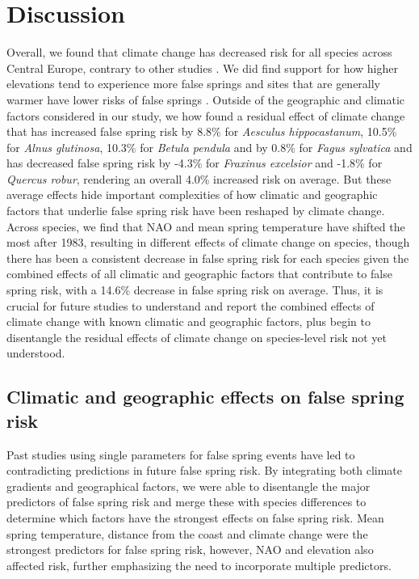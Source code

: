 \documentclass{article}\usepackage[]{graphicx}\usepackage[]{color}
\begin{document}
\renewcommand{\thetable}{\arabic{table}}
\renewcommand{\thefigure}{\arabic{figure}}
\renewcommand{\labelitemi}{$-$}

\section*{Discussion}
Overall, we found that climate change has decreased risk for all species across Central Europe, contrary to other studies \citep{Liu2018}. We did find support for how higher elevations tend to experience more false springs \citep{Vitasse2018, Vitra2017} and sites that are generally warmer have lower risks of false springs \citep{Wypych2016}. Outside of the geographic and climatic factors considered in our study, we how found a residual effect of climate change that has increased false spring risk by 8.8\% for \textit{Aesculus hippocastanum}, 10.5\% for \textit{Alnus glutinosa}, 10.3\% for \textit{Betula pendula} and by 0.8\% for \textit{Fagus sylvatica} and has decreased false spring risk by -4.3\% for \textit{Fraxinus excelsior} and -1.8\% for \textit{Quercus robur}, rendering an overall 4.0\% increased risk on average. But these average effects hide important complexities of how climatic and geographic factors that underlie false spring risk have been reshaped by climate change. Across species, we find that NAO and mean spring temperature have shifted the most after 1983, resulting in different effects of climate change on species, though there has been a consistent decrease in false spring risk for each species given the combined effects of all climatic and geographic factors that contribute to false spring risk, with a 14.6\% decrease in false spring risk on average. Thus, it is crucial for future studies to understand and report the combined effects of climate change with known climatic and geographic factors, plus begin to disentangle the residual effects of climate change on species-level risk not yet understood. %

\subsection*{Climatic and geographic effects on false spring risk}
Past studies using single parameters for false spring events \citep{Liu2018, Ma2018, Vitasse2018, Vitra2017, Wypych2016a} have led to contradicting predictions in future false spring risk. By integrating both climate gradients and geographical factors, we were able to disentangle the major predictors of false spring risk and merge these with species differences to determine which factors have the strongest effects on false spring risk. Mean spring temperature, distance from the coast and climate change were the strongest predictors for false spring risk, however, NAO and elevation also affected risk, further emphasizing the need to incorporate multiple predictors. 
\end{document}
